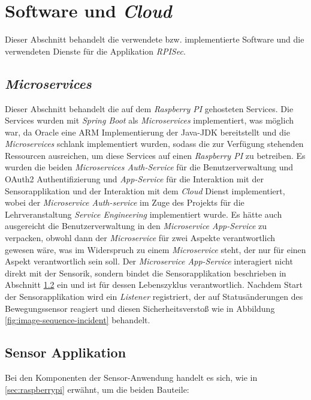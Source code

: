 
\section{Software und \emph{Cloud}}
Dieser Abschnitt behandelt die verwendete bzw. implementierte Software und die verwendeten Dienste für die Applikation \emph{RPISec}.

\subsection{\emph{Microservices}}
Dieser Abschnitt behandelt die auf dem \emph{Raspberry PI} gehosteten Services. Die Services wurden mit \emph{Spring Boot} als \emph{Microservices} implementiert, was möglich war, da Oracle eine ARM Implementierung der Java-JDK bereitstellt und die \emph{Microservices} schlank implementiert wurden, sodass die zur Verfügung stehenden Ressourcen ausreichen, um diese Services auf einen \emph{Raspberry PI} zu betreiben.
\newline
\newline
Es wurden die beiden \emph{Microservices Auth-Service} für die Benutzerverwaltung und OAuth2 Authentifizierung und \emph{App-Service} für die Interaktion mit der Sensorapplikation und der Interaktion mit dem \emph{Cloud} Dienst implementiert, wobei der \emph{Microservice Auth-service} im Zuge des Projekts für die Lehrveranstaltung \emph{Service Engineering} implementiert wurde. Es hätte auch ausgereicht die Benutzerverwaltung in den \emph{Microservice App-Service} zu verpacken, obwohl dann der \emph{Microservice} für zwei Aspekte verantwortlich gewesen wäre, was im Widerspruch zu einem \emph{Microservice} steht, der nur für einen Aspekt verantwortlich sein soll. 
\newline
\newline
Der \emph{Microservice App-Service} interagiert nicht direkt mit der Sensorik, sondern bindet die Sensorapplikation beschrieben in Abschnitt \ref{sec:sensor-application} ein und ist für dessen Lebenszyklus verantwortlich. Nachdem Start der Sensorapplikation wird ein \emph{Listener} registriert, der auf Statusänderungen des Bewegungssensor reagiert und diesen Sicherheitsverstoß wie in Abbildung \ref{fig:image-sequence-incident} behandelt.

\subsection{Sensor Applikation}
\label{sec:sensor-application}
Bei den Komponenten der Sensor-Anwendung handelt es sich, wie in \autoref{sec:raspberrypi} erwähnt, um die beiden Bauteile:

